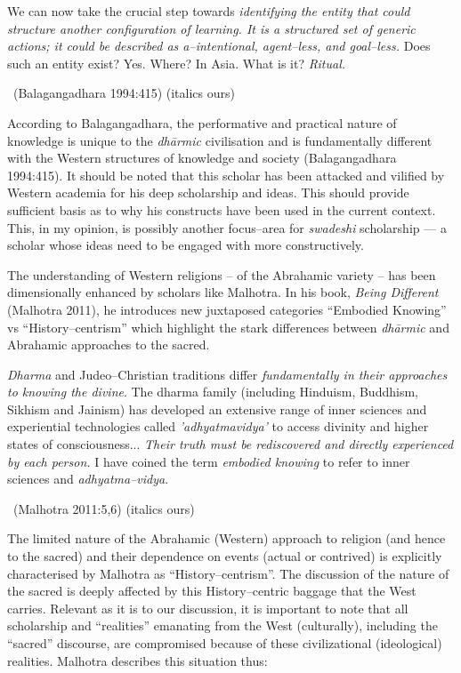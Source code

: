 \begin{myquote}
We can now take the crucial step towards \textit{identifying the entity that could structure another configuration of learning. It is a structured set of generic actions; it could be described as a–intentional, agent–less, and goal–less.} Does such an entity exist? Yes. Where? In Asia. What is it? \textit{Ritual.} 

~\hfill (Balagangadhara 1994:415) (italics ours)
\end{myquote}

According to Balagangadhara, the performative and practical nature of knowledge is unique to the \textit{dhārmic} civilisation and is fundamentally different with the Western structures of knowledge and society (Balagangadhara 1994:415). It should be noted that this scholar has been attacked and vilified by Western academia for his deep scholarship and ideas. This should provide sufficient basis as to why his constructs have been used in the current context. This, in my opinion, is possibly another focus–area for \textit{swadeshi} scholarship — a scholar whose ideas need to be engaged with more constructively.

The understanding of Western religions – of the Abrahamic variety – has been dimensionally enhanced by scholars like Malhotra. In his book, \textit{Being Different} (Malhotra 2011), he introduces new juxtaposed categories “Embodied Knowing” vs “History–centrism” which highlight the stark differences between \textit{dhārmic} and Abrahamic approaches to the sacred.

\begin{myquote}
\textit{Dharma} and Judeo–Christian traditions differ \textit{fundamentally in their approaches to knowing the divine}. The dharma family (including Hinduism, Buddhism, Sikhism and Jainism) has developed an extensive range of inner sciences and experiential technologies called \textit{'adhyatmavidya'} to access divinity and higher states of consciousness... \textit{Their truth must be rediscovered and directly experienced by each person.} I have coined the term \textit{embodied knowing} to refer to inner sciences and \textit{adhyatma–vidya}. 

~\hfill (Malhotra 2011:5,6) (italics ours)
\end{myquote}

The limited nature of the Abrahamic (Western) approach to religion (and hence to the sacred) and their dependence on events (actual or contrived) is explicitly characterised by Malhotra as “History–centrism”. The discussion of the nature of the sacred is deeply affected by this History–centric baggage that the West carries. Relevant as it is to our discussion, it is important to note that all scholarship and “realities” emanating from the West (culturally), including the “sacred” discourse, are compromised because of these civilizational (ideological) realities. Malhotra describes this situation thus:

